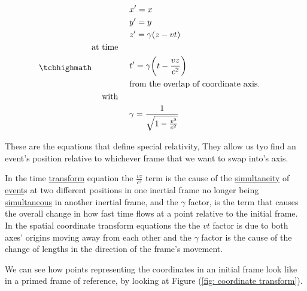 \begin{equation}
	\mhl{
		\begin{aligned}
			 & {x{'}} = x                                           \\
			 & {y{'}} = y                                           \\
			 & {z{'}} = {\gamma} ({z}-{v}{t})                       \\
			\text{at time \ \ \ }                                   \\
			 & {t{'}} = {\gamma} \bigg(t-\frac{{v}{z}}{{c}^2}\bigg) \\
			 & \text{from the overlap of coordinate axis. \ \ \ }   \\
			\text{with \ \ \ }                                      \\
			 & {\gamma} = \dfrac{1}{\sqrt{1-\frac{{v}^2}{{c}^2}}}
		\end{aligned}
	}
	\label{eq: Lorentz transformation}
\end{equation}

These are the equations that define special relativity, They allow us tyo find an event's position relative to whichever frame that we want to swap into's axis.

In the time \hyperlink{def-transform}{transform} equation the $\frac{{v}{z}}{{c}^2}$ term is the cause of the \hyperlink{def-simultaneity}{simultaneity} of \hyperlink{def-event}{event}s at two different positions in one inertial frame no longer being \hyperlink{def-simultaneity}{simultaneous} in another inertial frame, and the ${\gamma}$ factor, is the term that causes the overall change in how fast time flows at a point relative to the initial frame.
In the spatial coordinate transform equations the the ${v}{t}$ factor is due to both axes' origins moving away from each other and the ${\gamma}$ factor is the cause of the change of lengths in the direction of the frame's movement.

We can see how points representing the coordinates in an initial frame look like in a primed frame of reference, by looking at Figure (\ref{fig: coordinate transform}).

